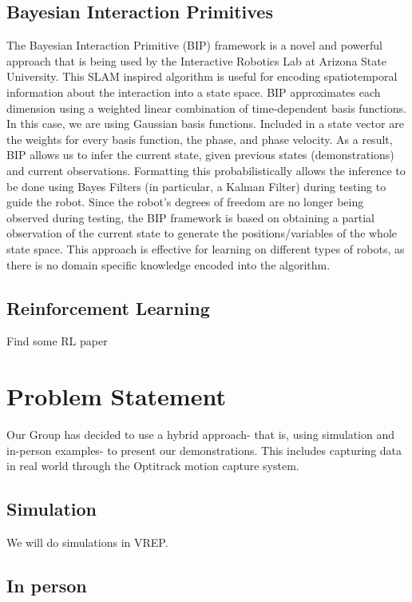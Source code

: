 \documentclass[letterpaper, 10 pt, conference]{ieeeconf}  %
\begin{document}
\subsection{Bayesian Interaction Primitives}
\indent The Bayesian Interaction Primitive (BIP) framework is a novel and powerful approach that is being used by the Interactive Robotics Lab at Arizona State University. This SLAM inspired algorithm is useful for encoding spatiotemporal information about the interaction into a state space. BIP approximates each dimension using a weighted linear combination of time-dependent basis functions. In this case, we are using Gaussian basis functions. Included in a state vector are the weights for every basis function, the phase, and phase velocity. As a result, BIP allows us to infer the current state, given previous states (demonstrations) and current observations. Formatting this probabilistically allows the inference to be done using Bayes Filters (in particular, a Kalman Filter) during testing to guide the robot. Since the robot's degrees of freedom are no longer being observed during testing, the BIP framework is based on obtaining a partial observation of the current state to generate the positions/variables of the whole state space. This approach is effective for learning on different types of robots, as there is no domain specific knowledge encoded into the algorithm.
\subsection{Reinforcement Learning}

Find some RL paper


\section{Problem Statement}
\indent Our Group has decided to use a hybrid approach- that is, using simulation and in-person examples- to present our demonstrations. This includes capturing data in real world through the Optitrack motion capture system.

\subsection{Simulation} 
We will do simulations in VREP.


\subsection{In person}
\end{document}
